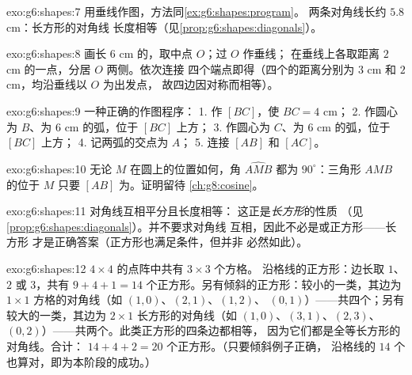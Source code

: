 \begin{solution}{exo:g6:shapes:7}
用垂线作图，方法同\cref{ex:g6:shapes:program}。
两条对角线长约 $5.8$ cm：长方形的对角线
长度相等（见\cref{prop:g6:shapes:diagonals}）。
\end{solution}

\begin{solution}{exo:g6:shapes:8}
画长 $6$ cm 的，取中点 $O$；过 $O$ 作垂线；
在垂线上各取距离 $2$ cm 的一点，分居 $O$ 两侧。依次连接
四个端点即得（四个的距离分别为
$3$ cm 和 $2$ cm，均沿垂线以 $O$ 为出发点，
故四边因对称而相等）。
\end{solution}

\begin{solution}{exo:g6:shapes:9}
一种正确的作图程序：
1. 作 $[BC]$，使 $BC = 4$ cm；
2. 作圆心为 $B$、为 $6$ cm 的弧，位于 $[BC]$ 上方；
3. 作圆心为 $C$、为 $6$ cm 的弧，位于 $[BC]$ 上方；
4. 记两弧的交点为 $A$；
5. 连接 $[AB]$ 和 $[AC]$。
\end{solution}

\begin{solution}{exo:g6:shapes:10}
无论 $M$ 在圆上的位置如何，角 $\widehat{AMB}$
都为 $90^\circ$：三角形 $AMB$ 的位于 $M$
只要 $[AB]$ 为。证明留待
\cref{ch:g8:cosine}。
\end{solution}

\begin{solution}{exo:g6:shapes:11}
对角线互相平分且长度相等：
这正是\emph{长方形}的性质
（见\cref{prop:g6:shapes:diagonals}）。并不要求对角线
互相，因此不必是或正方形——长方形
才是正确答案（正方形也满足条件，但并非
必然如此）。
\end{solution}

\begin{solution}{exo:g6:shapes:12}
$4 \times 4$ 的点阵中共有 $3 \times 3$ 个方格。
沿格线的正方形：边长取 $1$、$2$ 或 $3$，共有 $9 + 4 + 1 = 14$
个正方形。另有倾斜的正方形：较小的一类，其边为
$1 \times 1$ 方格的对角线（如 $(1,0)$、$(2,1)$、$(1,2)$、
$(0,1)$）——共四个；另有较大的一类，其边为
$2 \times 1$ 长方形的对角线（如 $(1,0)$、$(3,1)$、$(2,3)$、
$(0,2)$）——共两个。此类正方形的四条边都相等，
因为它们都是全等长方形的对角线。合计：
$14 + 4 + 2 = 20$ 个正方形。（只要倾斜例子正确，
沿格线的 $14$ 个也算对，即为本阶段的成功。）
\end{solution}

